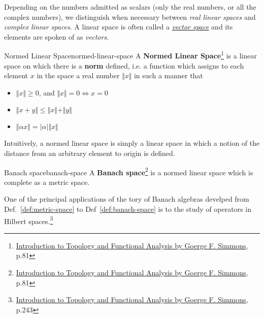 Depending on the numbers admitted as scalars (only the real numbers, or all the complex numbers), we distinguish when
necessary between \textit{real linear spaces} and \textit{complex linear spaces}. A linear space is often called a
\hyperlink{vector-space}{\textit{vector space}} and its elements are spoken of as \textit{vectors}.

\begin{Definition}{Normed Linear Space}{normed-linear-space}
    A \textbf{Normed Linear Space}\footnote{\href{https://trello.com/c/3EPccNTa}{Introduction to Topology and Functional Analysis by Goerge F. Simmons}, p.81}
    is a linear space on which there is a \textbf{norm} defined, i.e. a function which assigns to each element $x$ in
    the space a real number $\Vert x \Vert$ in such a manner that

    \begin{itemize}
        \item $\Vert x \Vert \ge 0$, and $\Vert x \Vert = 0 \iff x = 0$
        \item $\Vert x + y \Vert \le \Vert x \Vert + \Vert y \Vert$
        \item $\Vert \alpha x \Vert = \vert \alpha \vert \Vert x \Vert$
    \end{itemize}
\end{Definition}

Intuitively, a normed linear space is simply a linear space in which a notion of the distance from an arbitrary element
to origin is defined.

\begin{Definition}{Banach space}{banach-space}
    A \textbf{Banach space}\footnote{\href{https://trello.com/c/3EPccNTa}{Introduction to Topology and Functional Analysis by Goerge F. Simmons}, p.81}
    is a normed linear space which is complete as a metric space.
\end{Definition}



One of the principal applications of the tory of Banach algebras develped from Def.~\ref{def:metric-space} to
Def~\ref{def:banach-space} is to the study of operators in Hilbert
spaces.\footnote{\href{https://trello.com/c/3EPccNTa}{Introduction to Topology and Functional Analysis by Goerge F. Simmons}, p.243}

